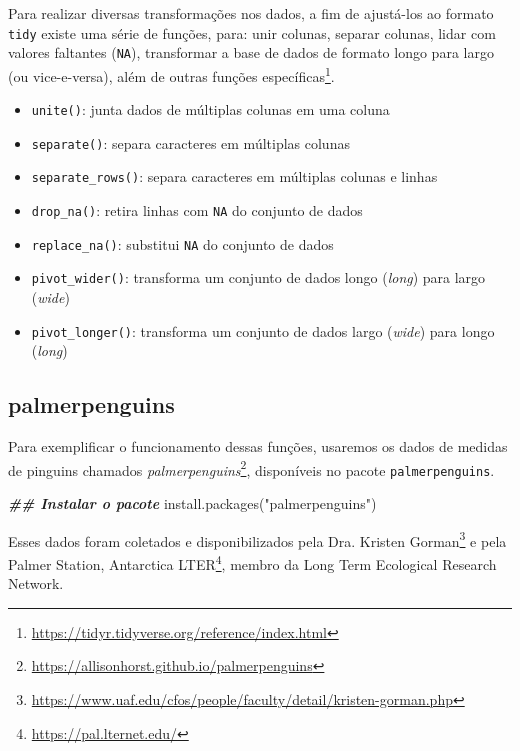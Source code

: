 \documentclass[
]{book}
\newenvironment{Shaded}{\begin{snugshade}}{\end{snugshade}}
\newcommand{\DocumentationTok}[1]{\textcolor[rgb]{0.37,0.37,0.37}{\textbf{\textit{#1}}}}
\newcommand{\FunctionTok}[1]{\textcolor[rgb]{0,0,0}{#1}}
\newcommand{\NormalTok}[1]{#1}
\newcommand{\StringTok}[1]{\textcolor[rgb]{0.5,0.5,0.5}{#1}}
\providecommand{\tightlist}{%
  \setlength{\itemsep}{0pt}\setlength{\parskip}{0pt}}
\renewcommand{\href}[2]{#2\footnote{\url{#1}}}
\begin{document}
Para realizar diversas transformações nos dados, a fim de ajustá-los ao formato \texttt{tidy} existe uma série de funções, para: unir colunas, separar colunas, lidar com valores faltantes (\texttt{NA}), transformar a base de dados de formato longo para largo (ou vice-e-versa), além de outras \href{https://tidyr.tidyverse.org/reference/index.html}{funções específicas}.

\begin{itemize}
\tightlist
\item
  \texttt{unite()}: junta dados de múltiplas colunas em uma coluna
\item
  \texttt{separate()}: separa caracteres em múltiplas colunas
\item
  \texttt{separate\_rows()}: separa caracteres em múltiplas colunas e linhas
\item
  \texttt{drop\_na()}: retira linhas com \texttt{NA} do conjunto de dados
\item
  \texttt{replace\_na()}: substitui \texttt{NA} do conjunto de dados
\item
  \texttt{pivot\_wider()}: transforma um conjunto de dados longo (\emph{long}) para largo (\emph{wide})
\item
  \texttt{pivot\_longer()}: transforma um conjunto de dados largo (\emph{wide}) para longo (\emph{long})
\end{itemize}

\hypertarget{palmerpenguins}{%
\subsection{palmerpenguins}\label{palmerpenguins}}

Para exemplificar o funcionamento dessas funções, usaremos os dados de medidas de pinguins chamados \href{https://allisonhorst.github.io/palmerpenguins}{\emph{palmerpenguins}}, disponíveis no pacote \texttt{palmerpenguins}.

\begin{Shaded}
\begin{Highlighting}[]
\DocumentationTok{\#\# Instalar o pacote}
\FunctionTok{install.packages}\NormalTok{(}\StringTok{"palmerpenguins"}\NormalTok{)}
\end{Highlighting}
\end{Shaded}

Esses dados foram coletados e disponibilizados pela \href{https://www.uaf.edu/cfos/people/faculty/detail/kristen-gorman.php}{Dra. Kristen Gorman} e pela \href{https://pal.lternet.edu/}{Palmer Station, Antarctica LTER}, membro da Long Term Ecological Research Network.
\end{document}

